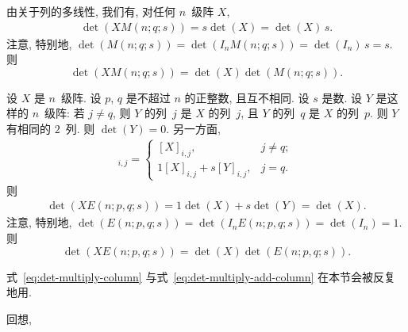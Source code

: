 \documentclass[../libro.tex]{subfiles}
\begin{document}
由关于列的多线性, 我们有, 对任何 \(n\)~级阵 \(X\),
\begin{align*}
    \det {(X M(n; q; s))}
    = s \det {(X)}
    = \det {(X)}\, s.
\end{align*}
注意, 特别地,
\(\det {(M(n; q; s))}
    = \det {(I_n M(n; q; s))}
    = \det {(I_n)}\, s
= s\).
则
\begin{equation}
    \det {(X M(n; q; s))}
    = \det {(X)} \det {(M(n; q; s))}.
    \label{eq:det-multiply-column}
\end{equation}

设 \(X\) 是 \(n\)~级阵.
设 \(p\), \(q\) 是不超过 \(n\) 的正整数,
且互不相同.
设 \(s\) 是数.
设 \(Y\) 是这样的 \(n\)~级阵:
若 \(j \neq q\), 则 \(Y\) 的列~\(j\) 是 \(X\) 的列~\(j\),
且 \(Y\) 的列~\(q\) 是 \(X\) 的列~\(p\).
则 \(Y\) 有相同的 \(2\)~列.
则 \(\det {(Y)} = 0\).
另一方面,
\begin{align*}
    [X E(n; p, q; s)]_{i,j} =
    \begin{cases}
        [X]_{i,j},                 & j \neq q; \\
        1 [X]_{i,j} + s [Y]_{i,j}, & j = q.
    \end{cases}
\end{align*}
则
\begin{align*}
    \det {(X E(n; p, q; s))}
    = 1 \det {(X)} + s \det {(Y)}
    = \det {(X)}.
\end{align*}
注意, 特别地,
\(\det {(E(n; p, q; s))}
    = \det {(I_n E(n; p, q; s))}
= \det {(I_n)} = 1\).
则
\begin{equation}
    \det {(X E(n; p, q; s))}
    = \det {(X)} \det {(E(n; p, q; s))}.
    \label{eq:det-multiply-add-column}
\end{equation}

式~\eqref{eq:det-multiply-column}
与式~\eqref{eq:det-multiply-add-column}
在本节会被反复地用.


回想,
\end{document}
